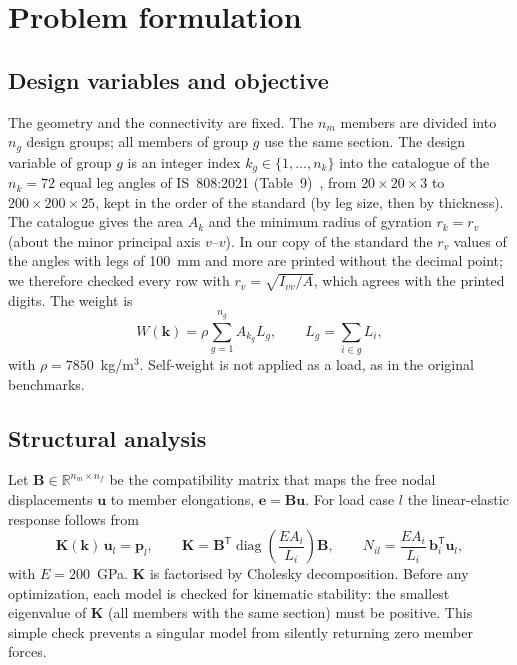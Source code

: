 \documentclass[lineno,pdflatex,sn-mathphys-num]{sn-jnl}
\begin{document}
\section{Problem formulation}
\label{sec:problem}

\subsection{Design variables and objective}
The geometry and the connectivity are fixed. The $n_m$ members are divided
into $n_g$ design groups; all members of group $g$ use the same section. The
design variable of group $g$ is an integer index $k_g\in\{1,\dots,n_k\}$ into
the catalogue of the $n_k=72$ equal leg angles of IS~808:2021
(Table~9)~\citep{IS808}, from $20\times20\times3$ to $200\times200\times25$,
kept in the order of the standard (by leg size, then by thickness). The
catalogue gives the area $A_k$ and the minimum radius of gyration $r_k=r_v$
(about the minor principal axis $v$--$v$). In our copy of the standard the
$r_v$ values of the angles with legs of 100~mm and more are printed without
the decimal point; we therefore checked every row with
$r_v=\sqrt{I_{vv}/A}$, which agrees with the printed digits. The weight is
\begin{equation}
  W(\mathbf{k}) = \rho \sum_{g=1}^{n_g} A_{k_g} L_g ,\qquad L_g=\sum_{i\in g} L_i ,
  \label{eq:W}
\end{equation}
with $\rho=7850$~kg/m$^3$. Self-weight is not applied as a load, as in the
original benchmarks.

\subsection{Structural analysis}
Let $\mathbf{B}\in\mathbb{R}^{n_m\times n_f}$ be the compatibility matrix that
maps the free nodal displacements $\mathbf{u}$ to member elongations,
$\mathbf{e}=\mathbf{B}\mathbf{u}$. For load case $l$ the linear-elastic
response follows from
\begin{equation}
  \mathbf{K}(\mathbf{k})\,\mathbf{u}_l=\mathbf{p}_l,\qquad
  \mathbf{K}=\mathbf{B}^{\mathsf T}\operatorname{diag}\!\left(\frac{EA_i}{L_i}\right)\mathbf{B},\qquad
  N_{il}=\frac{EA_i}{L_i}\,\mathbf{b}_i^{\mathsf T}\mathbf{u}_l ,
  \label{eq:dsm}
\end{equation}
with $E=200$~GPa. $\mathbf{K}$ is factorised by Cholesky decomposition. Before
any optimization, each model is checked for kinematic stability: the smallest
eigenvalue of $\mathbf{K}$ (all members with the same section) must be
positive. This simple check prevents a singular model from silently returning
zero member forces.
\end{document}
